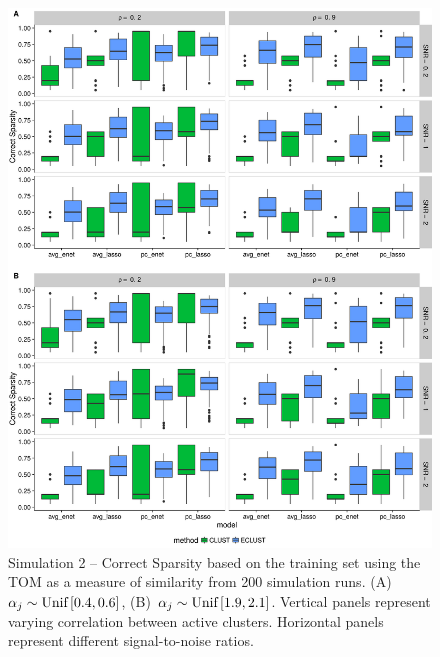 \begin{figure}[H]
	\centering
	\includegraphics[scale=0.58, keepaspectratio]{./figs/hydra/results/figures/sim2-sept8/CorrectSparsity_TOM_sim2.png}
	\caption{Simulation 2 -- Correct Sparsity based on the training set using the TOM as a measure of similarity from 200 simulation runs. \mbox{(A) $\alpha_{j} \sim \textrm{{Unif}}\left[0.4, 0.6\right]$}, \mbox{(B) $\alpha_{j} \sim \textrm{{Unif}}\left[1.9, 2.1\right]$}. Vertical panels represent varying correlation between active clusters. Horizontal panels represent different signal-to-noise ratios.}
	\label{fig:CorrectSparsity_TOM_sim2}
\end{figure}


